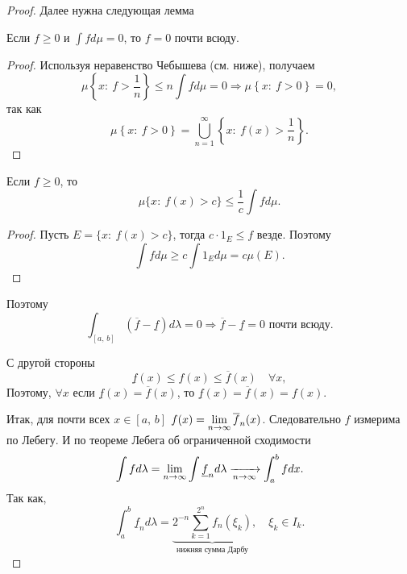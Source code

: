 \begin{theorem}
\begin{proof}
        Далее нужна следующая лемма
        \begin{lemma}
            Если $f\geqslant 0$ и $\int fd\mu=0$, то $f=0$ почти всюду.

            \begin{proof}

                Используя неравенство Чебышева (см. ниже), получаем \[
                    \mu\left\{x:\: f>\dfrac{1}{n}\right\}\leqslant
                    n\int fd\mu=0\Rightarrow
                    \mu\left\{x:\: f>0\right\}=0,
                \]
                так как \[
                    \mu\left\{x:\: f>0\right\}=\bigcup_{n=1}^{\infty}\left\{x:\: f(x)>\dfrac{1}{n}\right\}.
                \]

            \end{proof}
        \end{lemma}

        \begin{theorem}
            Если $f\geqslant 0$, то \[
                \mu\{x:\: f(x)>c\}\leqslant\dfrac{1}{c}\int fd\mu.
            \]

            \begin{proof}

                Пусть $E=\{x:\: f(x)>c\}$, тогда $c\cdot 1_E\leqslant f$ везде.
                Поэтому \[
                    \int fd\mu\geqslant c\int 1_{E}d\mu=c\mu(E).
                \]

            \end{proof}
        \end{theorem}

        Поэтому \[
            \int_{[a,\, b]}\left(\overline{f}-\underline{f}\right)d\lambda=0\Rightarrow
            \overline{f}-\underline{f}=0\text{ почти всюду.}
        \]

        С другой стороны\[
            \underline{f}(x)\leqslant f(x)\leqslant\overline{f}(x)\quad \forall x,
        \]
        Поэтому, $\forall x$ если $\underline{f}(x)=\overline{f}(x)$,
        то $\underline{f}(x)=\overline{f}(x)=f(x)$.

        Итак, для почти всех $x\in[a,\, b]$ $f(x)=\lim\limits_{n\to\infty}\overline{f}_n(x)$.
        Следовательно $f$ измерима по Лебегу.
        И по теореме Лебега об ограниченной сходимости \[
            \int fd\lambda=\lim_{n\to\infty}\int\underline{f}_nd\lambda\xrightarrow[n\to\infty]{}
            \int_{a}^b fdx.
        \]
        Так как,
        \[
            \int_{a}^b\underline{f}_nd\lambda=\underbrace{2^{-n}\sum_{k=1}^{2^n}f_n(\xi_k)}_
            {\text{нижняя сумма Дарбу}},\quad
            \xi_k\in I_k.
        \]

    \end{proof}
\end{theorem}

